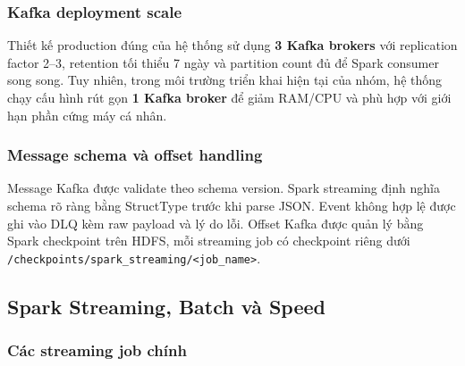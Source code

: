 \documentclass[12pt,a4paper]{article}
\begin{document}
\subsubsection{Kafka deployment scale}\label{kafka-deployment-scale}

Thiết kế production đúng của hệ thống sử dụng \textbf{3 Kafka brokers} với replication factor 2--3, retention tối thiểu 7 ngày và partition count đủ để Spark consumer song song. Tuy nhiên, trong môi trường triển khai hiện tại của nhóm, hệ thống chạy cấu hình rút gọn \textbf{1 Kafka broker} để giảm RAM/CPU và phù hợp với giới hạn phần cứng máy cá nhân.

\subsubsection{Message schema và offset handling}\label{message-schema-vuxe0-offset-handling}

Message Kafka được validate theo schema version. Spark streaming định nghĩa schema rõ ràng bằng StructType trước khi parse JSON. Event không hợp lệ được ghi vào DLQ kèm raw payload và lý do lỗi. Offset Kafka được quản lý bằng Spark checkpoint trên HDFS, mỗi streaming job có checkpoint riêng dưới \texttt{/checkpoints/spark\_streaming/\textless{}job\_name\textgreater{}}.

\subsection{Spark Streaming, Batch và Speed}\label{spark-streaming-batch-va-speed}

\subsubsection{Các streaming job chính}\label{cuxe1c-streaming-job-chuxednh}
\end{document}
